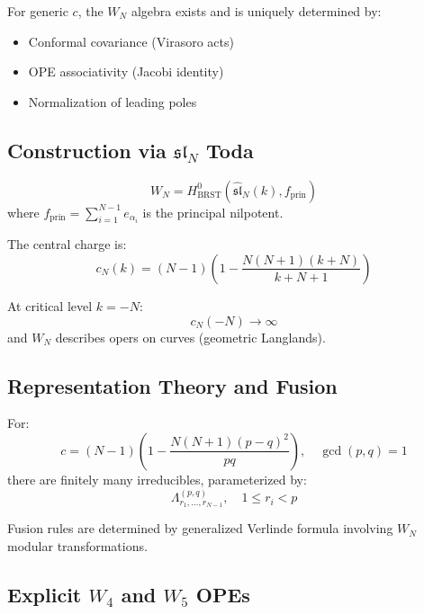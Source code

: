 \begin{theorem}
For generic $c$, the $W_N$ algebra exists and is uniquely determined by:
\begin{itemize}
\item Conformal covariance (Virasoro acts)
\item OPE associativity (Jacobi identity)
\item Normalization of leading poles
\end{itemize}
\end{theorem}

\subsection{Construction via $\mathfrak{sl}_N$ Toda}

\begin{theorem}
$$W_N = H^0_{\text{BRST}}(\widehat{\mathfrak{sl}}_N(k), f_{\text{prin}})$$
where $f_{\text{prin}} = \sum_{i=1}^{N-1} e_{\alpha_i}$ is the principal nilpotent.

The central charge is:
$$c_N(k) = (N-1)\left(1 - \frac{N(N+1)(k+N)}{k+N+1}\right)$$

At critical level $k = -N$:
$$c_N(-N) \to \infty$$
and $W_N$ describes opers on curves (geometric Langlands).
\end{theorem}

\subsection{Representation Theory and Fusion}

\begin{theorem}
\label{thm:wn-minimal}
For:
$$c = (N-1)\left(1 - \frac{N(N+1)(p-q)^2}{pq}\right), \quad \gcd(p,q) = 1$$
there are finitely many irreducibles, parameterized by:
$$\Lambda_{r_1, \ldots, r_{N-1}}^{(p,q)}, \quad 1 \le r_i < p$$

Fusion rules are determined by generalized Verlinde formula involving $W_N$ modular transformations.
\end{theorem}

\subsection{Explicit $W_4$ and $W_5$ OPEs}

